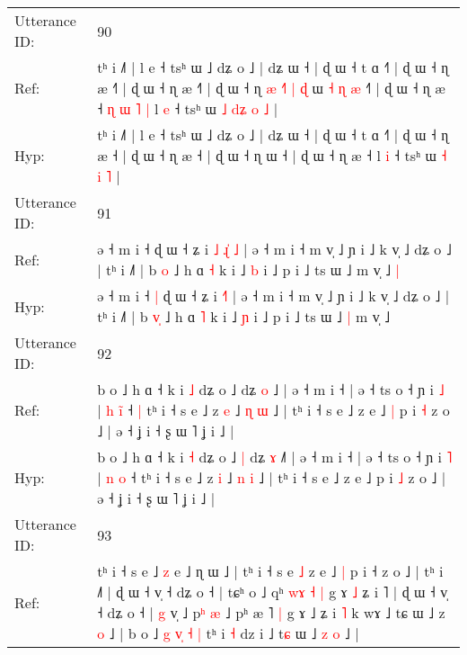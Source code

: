 \documentclass[10pt]{article}
\DeclareRobustCommand{\hl}[1]{{\textcolor{red}{#1}}}
\begin{document}
\begin{longtable}{ll}
 \\
\midrule
Utterance ID: & 90 \\
Ref: & tʰ i ˩˥ | l e ˧ tsʰ ɯ ˩ dʑ o ˩ | dʑ ɯ ˧ | ɖ ɯ ˧ t ɑ ˧˥ | ɖ ɯ ˧ ɳ æ ˧\hl{˥} | ɖ ɯ ˧ ɳ æ ˧\hl{˥} | ɖ ɯ ˧ ɳ\hl{ }\hl{æ}\hl{ }\hl{˧}\hl{˥}\hl{ }\hl{|}\hl{ }\hl{ɖ} ɯ\hl{ }\hl{˧}\hl{ }\hl{ɳ}\hl{ }\hl{æ} ˧\hl{˥} | ɖ ɯ ˧ ɳ æ ˧\hl{ }\hl{ɳ}\hl{ }\hl{ɯ}\hl{ }\hl{˥}\hl{ }\hl{|} l \hl{e} ˧ tsʰ ɯ\hl{ }\hl{˩} \hl{d}\hl{ʑ} \hl{o} \hl{˩} |
 \\
Hyp: & tʰ i ˩˥ | l e ˧ tsʰ ɯ ˩ dʑ o ˩ | dʑ ɯ ˧ | ɖ ɯ ˧ t ɑ ˧˥ | ɖ ɯ ˧ ɳ æ ˧\hl{} | ɖ ɯ ˧ ɳ æ ˧\hl{} | ɖ ɯ ˧ ɳ\hl{}\hl{}\hl{}\hl{}\hl{}\hl{}\hl{}\hl{}\hl{} ɯ\hl{}\hl{}\hl{}\hl{}\hl{}\hl{} ˧\hl{} | ɖ ɯ ˧ ɳ æ ˧\hl{}\hl{}\hl{}\hl{}\hl{}\hl{}\hl{}\hl{} l \hl{i} ˧ tsʰ ɯ\hl{}\hl{} \hl{}\hl{˧} \hl{i} \hl{˥} |
 \\
\midrule
Utterance ID: & 91 \\
Ref: & ə ˧ m i ˧\hl{}\hl{} ɖ ɯ ˧ ʑ i\hl{ }\hl{˩} \hl{ɻ}\hl{̍}\hl{ }\hl{˩} | ə ˧ m i ˧ m v̩ ˩ ɲ i ˩ k v̩ ˩ dʑ o ˩ | tʰ i ˩˥ | b \hl{}\hl{o} ˩ h ɑ \hl{˧} k i ˩ \hl{b} i ˩ p i ˩ ts ɯ ˩\hl{}\hl{} m v̩ ˩\hl{ }\hl{|}
 \\
Hyp: & ə ˧ m i ˧\hl{ }\hl{|} ɖ ɯ ˧ ʑ i\hl{}\hl{} \hl{}\hl{}\hl{˧}\hl{˥} | ə ˧ m i ˧ m v̩ ˩ ɲ i ˩ k v̩ ˩ dʑ o ˩ | tʰ i ˩˥ | b \hl{v}\hl{̩} ˩ h ɑ \hl{˥} k i ˩ \hl{ɲ} i ˩ p i ˩ ts ɯ ˩\hl{ }\hl{|} m v̩ ˩\hl{}\hl{}
 \\
\midrule
Utterance ID: & 92 \\
Ref: & b o ˩ h ɑ ˧ k i \hl{˩} dʑ o ˩\hl{}\hl{} dʑ \hl{o} ˩\hl{} | ə ˧ m i ˧ | ə ˧ ts o ˧ ɲ i \hl{˩} | \hl{h} \hl{i}\hl{̃} ˧\hl{ }\hl{|} tʰ i ˧ s e ˩ z \hl{e} ˩ \hl{ɳ} \hl{ɯ} ˩ | tʰ i ˧ s e ˩ z e ˩\hl{ }\hl{|} p i \hl{˧} z o ˩ | ə ˧ ʝ i ˧ ʂ ɯ ˥ ʝ i ˩ |
 \\
Hyp: & b o ˩ h ɑ ˧ k i \hl{˧} dʑ o ˩\hl{ }\hl{|} dʑ \hl{ɤ} ˩\hl{˥} | ə ˧ m i ˧ | ə ˧ ts o ˧ ɲ i \hl{˥} | \hl{n} \hl{}\hl{o} ˧\hl{}\hl{} tʰ i ˧ s e ˩ z \hl{i} ˩ \hl{n} \hl{i} ˩ | tʰ i ˧ s e ˩ z e ˩\hl{}\hl{} p i \hl{˩} z o ˩ | ə ˧ ʝ i ˧ ʂ ɯ ˥ ʝ i ˩ |
 \\
\midrule
Utterance ID: & 93 \\
Ref: & tʰ i ˧ s e ˩ \hl{z} e ˩ ɳ ɯ ˩ | tʰ i ˧ s e \hl{˩} z e ˩\hl{ }\hl{|} p i ˧ z o ˩ | tʰ i ˩˥ | ɖ ɯ ˧ v̩ ˧ dʑ o ˧ | tɕʰ o ˩ qʰ \hl{w}\hl{ɤ} \hl{˧}\hl{ }\hl{|} g ɤ \hl{˩} ʑ\hl{}\hl{}\hl{} i ˥ | ɖ ɯ ˧ v̩ ˧ dʑ o ˧ | \hl{g} v̩ ˩ p\hl{ʰ}\hl{ }\hl{æ} ˩ pʰ æ ˥\hl{}\hl{}\hl{}\hl{}\hl{} \hl{|} g ɤ ˩ ʑ i \hl{˥} k wɤ ˩ tɕ ɯ ˩ z \hl{o} ˩ | b o ˩ \hl{g} \hl{}\hl{v}\hl{̩} \hl{}\hl{˧} \hl{|} tʰ i \hl{˧} d\hl{}\hl{}\hl{}\hl{}\hl{}\hl{}z i ˩ t\hl{}\hl{ɕ} ɯ ˩ \hl{z} \hl{}\hl{o} ˩ |

\end{longtable}
\end{document}

